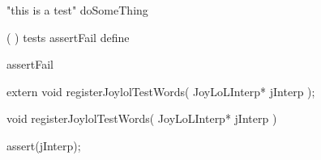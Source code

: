 \startJoylolTest
"this is a test"
doSomeThing
\stopJoylolTest
\stopTestCase
\stopTestSuite

\startTestSuite[assertFail]

\startJoylolCode
(
)
tests
assertFail
define
\stopJoylolCode

\startJoylolTest
assertFail
\stopJoylolTest
\stopTestCase
\stopTestSuite

\startTestSuite[assertSucceed]

\stopTestSuite

\startTestSuite[assertTrue]

\stopTestSuite

\startTestSuite[assertFalse]

\stopTestSuite

\startTestSuite[assertNil]

\stopTestSuite

\startTestSuite[assertNotNil]

\stopTestSuite

\startTestSuite[assertAtom]

\stopTestSuite

\startTestSuite[assertPair]

\stopTestSuite

\startTestSuite[assertNatural]

\stopTestSuite

\startTestSuite[assertSymbol]

\stopTestSuite

\startTestSuite[assertContext]

\stopTestSuite

\startTestSuite[assertDictionary]

\stopTestSuite

\startTestSuite[assertDictNode]

\stopTestSuite


\startCHeader
extern void registerJoylolTestWords(
  JoyLoLInterp* jInterp
);
\stopCHeader
{}

\startCCode
void registerJoylolTestWords(
  JoyLoLInterp* jInterp
) {
  assert(jInterp);

}
\stopCCode